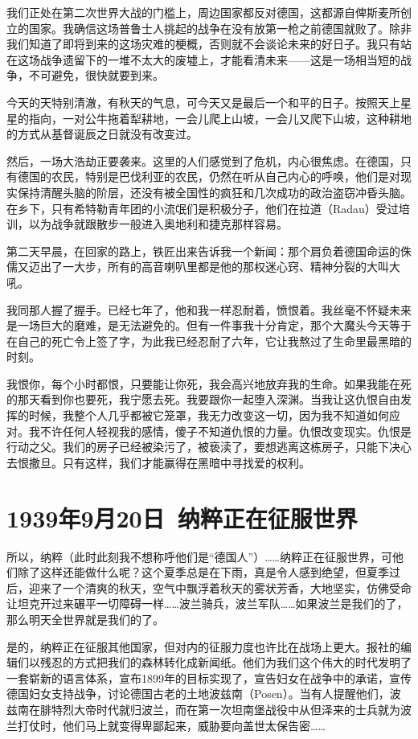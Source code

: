 \documentclass[UTF8]{ctexart}
\begin{document}
我们正处在第二次世界大战的门槛上，周边国家都反对德国，这都源自俾斯麦所创立的国家。我确信这场普鲁士人挑起的战争在没有放第一枪之前德国就败了。除非我们知道了即将到来的这场灾难的梗概，否则就不会谈论未来的好日子。我只有站在这场战争遗留下的一堆不太大的废墟上，才能看清未来——这是一场相当短的战争，不可避免，很快就要到来。

今天的天特别清澈，有秋天的气息，可今天又是最后一个和平的日子。按照天上星星的指向，一对公牛拖着犁耕地，一会儿爬上山坡，一会儿又爬下山坡，这种耕地的方式从基督诞辰之日就没有改变过。

然后，一场大浩劫正要袭来。这里的人们感觉到了危机，内心很焦虑。在德国，只有德国的农民，特别是巴伐利亚的农民，仍然在听从自己内心的呼唤，他们是对现实保持清醒头脑的阶层，还没有被全国性的疯狂和几次成功的政治盗窃冲昏头脑。在乡下，只有希特勒青年团的小流氓们是积极分子，他们在拉道（Radau）受过培训，以为战争就跟散步一般进入奥地利和捷克那样容易。

第二天早晨，在回家的路上，铁匠出来告诉我一个新闻：那个肩负着德国命运的侏儒又迈出了一大步，所有的高音喇叭里都是他的那权迷心窍、精神分裂的大叫大吼。

我同那人握了握手。已经七年了，他和我一样忍耐着，愤恨着。我丝毫不怀疑未来是一场巨大的磨难，是无法避免的。但有一件事我十分肯定，那个大魔头今天等于在自己的死亡令上签了字，为此我已经忍耐了六年，它让我熬过了生命里最黑暗的时刻。

我恨你，每个小时都恨，只要能让你死，我会高兴地放弃我的生命。如果我能在死的那天看到你也要死，我宁愿去死。我要跟你一起堕入深渊。当我让这仇恨自由发挥的时候，我整个人几乎都被它笼罩，我无力改变这一切，因为我不知道如何应对。我不许任何人轻视我的感情，傻子不知道仇恨的力量。仇恨改变现实。仇恨是行动之父。我们的房子已经被染污了，被亵渎了，要想逃离这栋房子，只能下决心去恨撒旦。只有这样，我们才能赢得在黑暗中寻找爱的权利。

\section{1939年9月20日\ 纳粹正在征服世界}

所以，纳粹（此时此刻我不想称呼他们是“德国人”）……纳粹正在征服世界，可他们除了这样还能做什么呢？这个夏季总是在下雨，真是令人感到绝望，但夏季过后，迎来了一个清爽的秋天，空气中飘浮着秋天的雾状芳香，大地坚实，仿佛受命让坦克开过来碾平一切障碍一样……波兰骑兵，波兰军队……如果波兰是我们的了，那么明天全世界就是我们的了。

是的，纳粹正在征服其他国家，但对内的征服力度也许比在战场上更大。报社的编辑们以残忍的方式把我们的森林转化成新闻纸。他们为我们这个伟大的时代发明了一套崭新的语言体系，宣布1899年的目标实现了，宣告妇女在战争中的承诺，宣传德国妇女支持战争，讨论德国古老的土地波兹南（Posen）。当有人提醒他们，波兹南在腓特烈大帝时代就归波兰，而在第一次坦南堡战役中从但泽来的士兵就为波兰打仗时，他们马上就变得卑鄙起来，威胁要向盖世太保告密……
\end{document}
